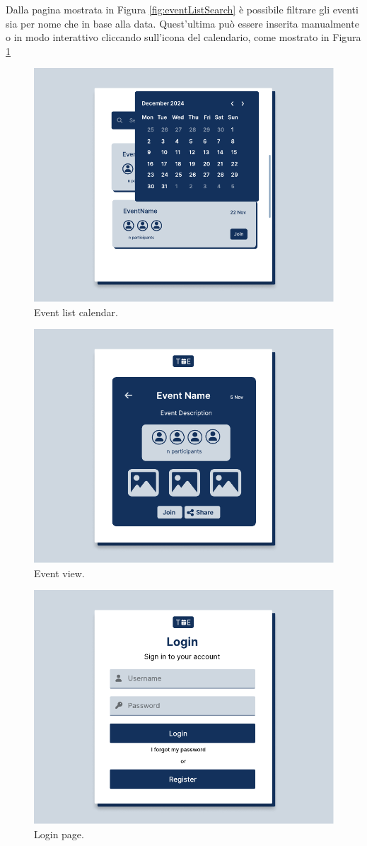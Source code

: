 \documentclass[9pt]{extarticle}
\begin{document}
Dalla pagina mostrata in Figura \ref{fig:eventListSearch} è possibile filtrare gli eventi sia per nome che in base alla data. Quest'ultima può essere inserita manualmente o in modo interattivo cliccando sull'icona del calendario, come mostrato in Figura \ref{fig:eventListSearchCalendar}

\begin{figure}[!htb]
	\centering
	\includegraphics[width=.7\linewidth]{./images/eventListSearchCalendar.pdf}
	\caption{Event list calendar.}
	\label{fig:eventListSearchCalendar}
\end{figure}
\newpage

\begin{figure}[!htb]
	\centering
	\includegraphics[width=.7\linewidth]{./images/EventView.pdf}
	\caption{Event view.}
	\label{fig:eventView}
\end{figure}


\begin{figure}[!htb]
	\centering
	\includegraphics[width=.7\linewidth]{./images/Login.pdf}
	\caption{Login page.}
	\label{fig:login}
\end{figure}
\end{document}
